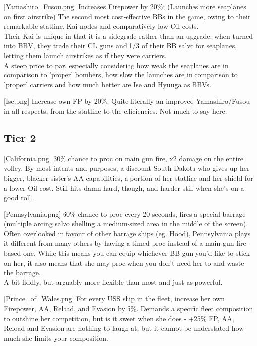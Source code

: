 [Yamashiro_Fusou.png]
{Increases Firepower by 20\%; (Launches more seaplanes on first airstrike)}
{}
{The second most cost-effective BBs in the game, owing to their remarkable statline, Kai nodes and comparatively low Oil costs.\\
Their Kai is unique in that it is a sidegrade rather than an upgrade: when turned into BBV, they trade their CL guns and 1/3 of their BB salvo for seaplanes, letting them launch airstrikes as if they were carriers.\\
A steep price to pay, especially considering how weak the seaplanes are in comparison to 'proper' bombers, how slow the launches are in comparison to 'proper' carriers and how much better are Ise and Hyuuga as BBVs.}
 
[Ise.png]
{Increase own FP by 20\%.}
{}
{Quite literally an improved Yamashiro/Fusou in all respects, from the statline to the efficiencies. Not much to say here.}

 
\newpage
\subsection{Tier 2}
[California.png]
{30\% chance to proc on main gun fire, x2 damage on the entire volley.}
{}
{By most intents and purposes, a discount South Dakota who gives up her bigger, blacker sister's AA capabilities, a portion of her statline and her shield for a lower Oil cost. Still hits damn hard, though, and harder still when she's on a good roll.}

[Pennsylvania.png]
{60\% chance to proc every 20 seconds, fires a special barrage (multiple arcing salvo shelling a medium-sized area in the middle of the screen).}
{}
{Often overlooked in favour of other barrage ships (eg. Hood), Pennsylvania plays it different from many others by having a timed proc instead of a main-gun-fire-based one. While this means you can equip whichever BB gun you'd like to stick on her, it also means that she may proc when you don't need her to and waste the barrage.\\
A bit fiddly, but arguably more flexible than most and just as powerful.}

[Prince_of_Wales.png]
{For every USS ship in the fleet, increase her own Firepower, AA, Reload, and Evasion by 5\%.}
{}
{Demands a specific fleet composition to outshine her competition, but is it sweet when she does - +25\% FP, AA, Reload and Evasion are nothing to laugh at, but it cannot be understated how much she limits your composition.}

